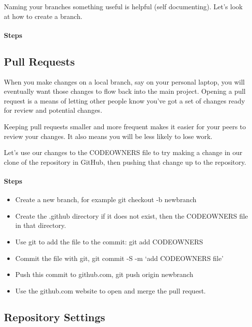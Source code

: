\justify{}
Naming your branches something useful is helpful (self documenting). Let's look at how
to create a branch.

\hypertarget{steps-3}{%
      \paragraph{Steps}\label{steps-3}}

\subsection{Pull Requests}

\justify{}
When you make changes on a local branch, say on your personal laptop, you will eventually want those changes
to flow back into the main project. Opening a pull request is a means of letting other
people know you've got a set of changes ready for review and potential changes.

\justify{}
Keeping pull requests smaller and more frequent makes it easier for your
peers to review your changes. It also means you will be less likely to lose work.

\justify{}
Let's use our changes to the CODEOWNERS file to try making a change in our clone of the repository in GitHub,
then pushing that change up to the repository.

\hypertarget{steps-4}{%
      \paragraph{Steps}\label{steps-4}}

\begin{itemize}
      \item
            Create a new branch, for example git checkout -b newbranch
      \item
            Create the .github directory if it does not exist, then the CODEOWNERS
            file in that directory.
      \item
            Use git to add the file to the commit: git add CODEOWNERS
      \item
            Commit the file with git, git commit -S -m `add CODEOWNERS file'
      \item
            Push this commit to github.com, git push origin newbranch
      \item
            Use the github.com website to open and merge the pull request.
\end{itemize}
\subsection{Repository Settings}

